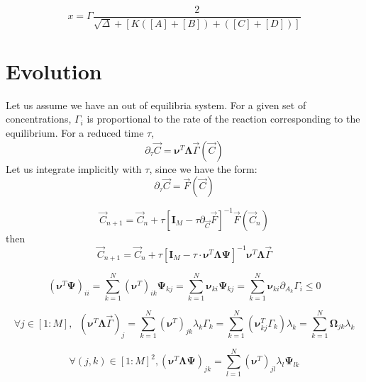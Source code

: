 \documentclass[aps,12pt]{revtex4}
\begin{document}
\begin{equation}
x = \Gamma \dfrac{2}{\sqrt{\Delta}+\left[K([A]+[B])+([C]+[D])\right]}
\end{equation}

\section{Evolution}
Let us assume we have an out of equilibria system.
For a given set of concentrations, $\Gamma_i$ is proportional
to the rate of the reaction corresponding to the equilibrium.
For a reduced time $\tau$,
\begin{equation}
	\partial_\tau \vec{C} = \bm{\nu}^T    \bm{\Lambda} \vec{\Gamma}(\vec{C})
\end{equation}
Let us integrate implicitly with $\tau$, since we have the form:
\begin{equation}
	\partial_\tau \vec{C} = \vec{F}(\vec{C})
\end{equation}

\begin{equation}
	\vec{C}_{n+1} = \vec{C}_n +  \tau\left[ \bm{I}_M - \tau \partial_{\vec{C}} \vec{F} \right]^{-1} \vec{F}(\vec{C}_n)
\end{equation}
then
\begin{equation}
	\vec{C}_{n+1} = \vec{C}_n + \tau\left[ \bm{I}_M - \tau  \cdot \bm{\nu}^T   \bm{\Lambda} \bm{\Psi} \right]^{-1}  
	\bm{\nu}^T     \bm{\Lambda} \vec{\Gamma}
\end{equation}


\begin{equation}
	(\bm{\nu}^T \bm{\Psi})_{ii} = \sum_{k=1}^N (\bm{\nu}^T)_{ik} \bm{\Psi}_{kj} =  \sum_{k=1}^N \bm{\nu}_{ki} \bm{\Psi}_{kj}
= \sum_{k=1}^N \bm{\nu}_{ki} \partial_{A_k}\Gamma_i \leq 0
\end{equation}

\begin{equation}
	\forall j \in [1:M], \;\; (\bm{\nu}^T     \bm{\Lambda} \vec{\Gamma})_j = \sum_{k=1}^N (\bm{\nu}^T)_{jk} \lambda_k \Gamma_k = 
	\sum_{k=1}^N (\bm{\nu}^T_{kj}\Gamma_k)  \lambda_k = \sum_{k=1}^N \bm{\Omega}_{jk} \lambda_k
\end{equation}

\begin{equation}
	\forall (j,k) \in [1:M]^2, (\bm{\nu}^T   \bm{\Lambda} \bm{\Psi})_{jk} 
	= \sum_{l=1}^N (\bm{\nu}^T)_{jl} \lambda_l \bm{\Psi}_{lk}
\end{equation}



 
\end{document}
